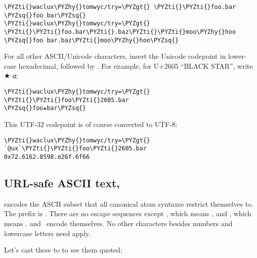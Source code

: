 \begin{framed_shaded}
\begin{Verbatim}[fontsize=\relsize{-2.5},fontseries=b,commandchars=\\\{\}]
\PYZti{}waclux\PYZhy{}tomwyc/try=\PYZgt{} \PYZti{}\PYZti{}foo.bar
\PYZsq{}foo bar\PYZsq{}
\PYZti{}waclux\PYZhy{}tomwyc/try=\PYZgt{} \PYZti{}\PYZti{}foo.bar\PYZti{}.baz\PYZti{}\PYZti{}moo\PYZhy{}hoo
\PYZsq{}foo bar.baz\PYZti{}moo\PYZhy{}hoo\PYZsq{}
\end{Verbatim}
\end{framed_shaded}

For all other ASCII/Unicode characters, insert the Unicode
codepoint in lower-case hexadecimal, followed by .  For
example, for U+2605 ``BLACK STAR'', write ★ α:

\begin{framed_shaded}
\begin{Verbatim}[fontsize=\relsize{-2.5},fontseries=b,commandchars=\\\{\}]
\PYZti{}waclux\PYZhy{}tomwyc/try=\PYZgt{} \PYZti{}\PYZti{}foo\PYZti{}2605.bar
\PYZsq{}foo★bar\PYZsq{}
\end{Verbatim}
\end{framed_shaded}

This UTF-32 codepoint is of course converted to UTF-8:

\begin{framed_shaded}
\begin{Verbatim}[fontsize=\relsize{-2.5},fontseries=b,commandchars=\\\{\}]
\PYZti{}waclux\PYZhy{}tomwyc/try=\PYZgt{} `@ux`\PYZti{}\PYZti{}foo\PYZti{}2605.bar
0x72.6162.8598.e26f.6f66
\end{Verbatim}
\end{framed_shaded}

\subsection{URL-safe ASCII text, }

 encodes the ASCII subset that all canonical atom syntaxes
restrict themselves to.  The prefix is .  There are no escape
sequences except \kode{\sig\sig}, which means \kode{\sig}, and \kode{\sig-}, which means
\kode{\_}.  \kode{-} and \ encode themselves.  No other characters
besides numbers and lowercase letters need apply.

Let's cast these to  to see them quoted:

